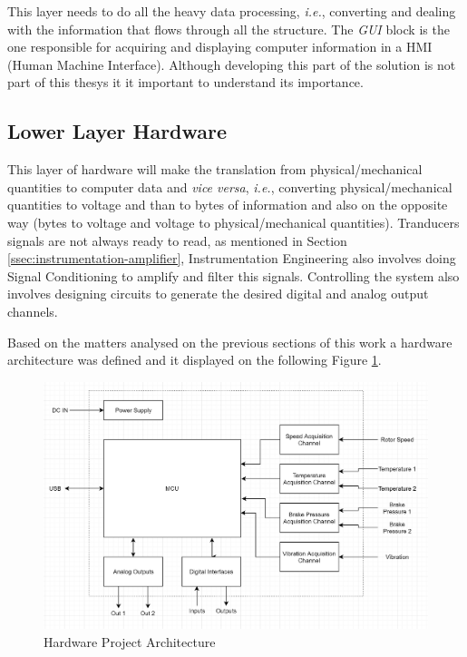 		This layer needs to do all the heavy data processing, \textit{i.e.}, converting and dealing with the information that flows through all the structure. The \textit{GUI} block is the one responsible for acquiring and displaying computer information in a HMI (Human Machine Interface). Although developing this part of the solution is not part of this thesys it it important to understand its importance.

	\subsection{Lower Layer Hardware}\label{ssec:lowerLayerlHardware}

		This layer of hardware will make the translation from physical/mechanical quantities to computer data and \textit{vice versa}, \textit{i.e.}, converting physical/mechanical quantities to voltage and than to bytes of information and also on the opposite way (bytes to voltage and voltage to physical/mechanical quantities). Tranducers signals are not always ready to read, as mentioned in Section \ref{ssec:instrumentation-amplifier}, Instrumentation Engineering also involves doing Signal Conditioning to amplify and filter this signals. Controlling the system also involves designing circuits to generate the desired digital and analog output channels.
		\par
		Based on the matters analysed on the previous sections of this work a hardware architecture was defined and it displayed on the following Figure \ref{fig:hardwareProject}.
	
		\begin{figure}[htbp]
			\centering
			\includegraphics[width=1.1\textwidth]{figuras/fig-hardwareProject}
			\caption{Hardware Project Architecture}
			\label{fig:hardwareProject}
		\end{figure}

